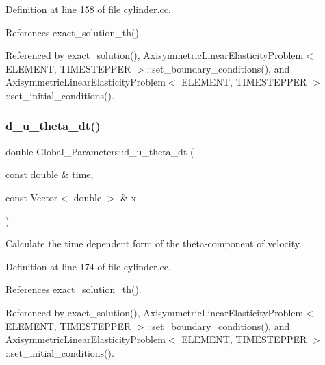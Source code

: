 Definition at line 158 of file cylinder.\+cc.



References exact\+\_\+solution\+\_\+th().



Referenced by exact\+\_\+solution(), Axisymmetric\+Linear\+Elasticity\+Problem$<$ E\+L\+E\+M\+E\+N\+T, T\+I\+M\+E\+S\+T\+E\+P\+P\+E\+R $>$\+::set\+\_\+boundary\+\_\+conditions(), and Axisymmetric\+Linear\+Elasticity\+Problem$<$ E\+L\+E\+M\+E\+N\+T, T\+I\+M\+E\+S\+T\+E\+P\+P\+E\+R $>$\+::set\+\_\+initial\+\_\+conditions().

\mbox{\label{namespaceGlobal__Parameters_a87fd49f1b07cd74a364cf1373890864e}} 
\subsubsection{\texorpdfstring{d\+\_\+u\+\_\+theta\+\_\+dt()}{d\_u\_theta\_dt()}}
{\footnotesize\ttfamily double Global\+\_\+\+Parameters\+::d\+\_\+u\+\_\+theta\+\_\+dt (\begin{DoxyParamCaption}\item[{const double \&}]{time,  }\item[{const Vector$<$ double $>$ \&}]{x }\end{DoxyParamCaption})}



Calculate the time dependent form of the theta-\/component of velocity. 



Definition at line 174 of file cylinder.\+cc.



References exact\+\_\+solution\+\_\+th().



Referenced by exact\+\_\+solution(), Axisymmetric\+Linear\+Elasticity\+Problem$<$ E\+L\+E\+M\+E\+N\+T, T\+I\+M\+E\+S\+T\+E\+P\+P\+E\+R $>$\+::set\+\_\+boundary\+\_\+conditions(), and Axisymmetric\+Linear\+Elasticity\+Problem$<$ E\+L\+E\+M\+E\+N\+T, T\+I\+M\+E\+S\+T\+E\+P\+P\+E\+R $>$\+::set\+\_\+initial\+\_\+conditions().

\mbox{\label{namespaceGlobal__Parameters_adc07c67f4203664ac0c23c4ff9d4dac1}} 
